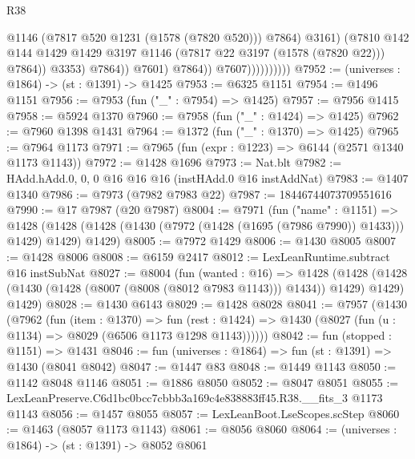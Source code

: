 \begin{lexlean}{R38}
\begin{coremodule}
                                          @1146
                                          (@7817 @520 @1231 (@1578 (@7820 @520)))
                                          @7864)
                                        @3161)
                                      (@7810
                                        @142
                                        @144
                                        @1429
                                        @1429
                                        @3197
                                        @1146
                                        (@7817 @22 @3197 (@1578 (@7820 @22)))
                                        @7864))
                                    @3353)
                                  @7864))
                              @7601)
                            @7864))
                        @7607))))))))))
@7952 := (universes : @1864) -> (st : @1391) -> @1425
@7953 := @6325 @1151
@7954 := @1496 @1151
@7956 := @7953 (fun ("_" : @7954) => @1425)
@7957 := @7956 @1415
@7958 := @5924 @1370
@7960 := @7958 (fun ("_" : @1424) => @1425)
@7962 := @7960 @1398 @1431
@7964 := @1372 (fun ("_" : @1370) => @1425)
@7965 := @7964 @1173
@7971 := @7965 (fun (expr : @1223) => @6144 (@2571 @1340 @1173 @1143))
@7972 := @1428 @1696
@7973 := Nat.blt
@7982 := HAdd.hAdd.{0, 0, 0} @16 @16 @16 (instHAdd.{0} @16 instAddNat)
@7983 := @1407 @1340
@7986 := @7973 (@7982 @7983 @22)
@7987 := 18446744073709551616
@7990 := @17 @7987 (@20 @7987)
@8004 := @7971
    (fun ("name" : @1151) =>
    @1428 (@1428 (@1428 (@1430 (@7972 (@1428 (@1695 (@7986 @7990)) @1433))) @1429) @1429) @1429)
@8005 := @7972 @1429
@8006 := @1430 @8005
@8007 := @1428 @8006
@8008 := @6159 @2417
@8012 := LexLeanRuntime.subtract @16 instSubNat
@8027 := @8004
    (fun (wanted : @16) =>
    @1428
      (@1428 (@1428 (@1430 (@1428 (@8007 (@8008 (@8012 @7983 @1143))) @1434)) @1429) @1429)
      @1429)
@8028 := @1430 @6143
@8029 := @1428 @8028
@8041 := @7957
    (@1430
      (@7962
        (fun (item : @1370) =>
        fun (rest : @1424) => @1430 (@8027 (fun (u : @1134) => @8029 (@6506 @1173 @1298 @1143))))))
@8042 := fun (stopped : @1151) => @1431
@8046 := fun (universes : @1864) => fun (st : @1391) => @1430 (@8041 @8042)
@8047 := @1447 @83
@8048 := @1449 @1143
@8050 := @1142 @8048 @1146
@8051 := @1886 @8050
@8052 := @8047 @8051
@8055 := LexLeanPreserve.C6d1bc0bcc7cbbb3a169c4e838883ff45.R38.__fits_3 @1173 @1143
@8056 := @1457 @8055
@8057 := LexLeanBoot.LseScopes.scStep
@8060 := @1463 (@8057 @1173 @1143)
@8061 := @8056 @8060
@8064 := (universes : @1864) -> (st : @1391) -> @8052 @8061

\end{coremodule}
\end{lexlean}
